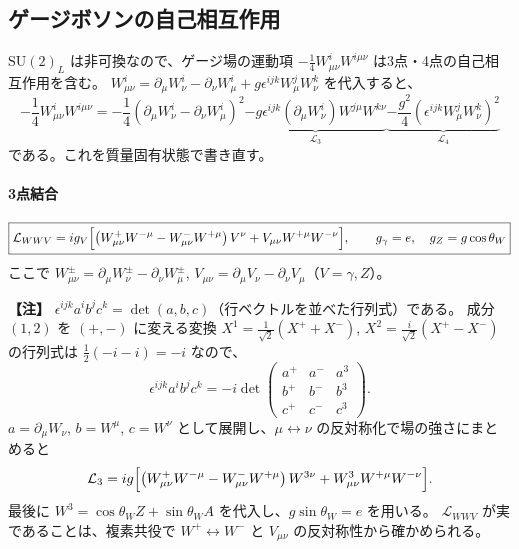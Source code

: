 \documentclass[uplatex,dvipdfmx,a4paper,11pt,openany]{jsbook}
\newenvironment{note}{\vspace{1ex}\par\footnotesize\noindent\textbf{【注】}}{\par\vspace{1ex}}
\numberwithin{equation}{chapter}
\theoremstyle{definition}
\theoremstyle{plain}
\theoremstyle{remark}
\newcommand{\Lag}{\mathcal{L}}
\newcommand{\SU}{\mathrm{SU}}
\begin{document}
\subsection{ゲージボソンの自己相互作用}
$\SU(2)_L$ は非可換なので、ゲージ場の運動項 $-\frac14W^i_{\mu\nu}W^{i\mu\nu}$ は3点・4点の自己相互作用を含む。
$W^i_{\mu\nu}=\partial_\mu W^i_\nu-\partial_\nu W^i_\mu+g\epsilon^{ijk}W^j_\mu W^k_\nu$ を代入すると、
\begin{equation}
-\frac14W^i_{\mu\nu}W^{i\mu\nu}
=-\frac14\left(\partial_\mu W^i_\nu-\partial_\nu W^i_\mu\right)^2
\underbrace{-g\epsilon^{ijk}(\partial_\mu W^i_\nu)W^{j\mu}W^{k\nu}}_{\Lag_3}
\underbrace{-\frac{g^2}{4}\left(\epsilon^{ijk}W^j_\mu W^k_\nu\right)^2}_{\Lag_4}
\end{equation}
である。これを質量固有状態で書き直す。
\paragraph{3点結合}
\begin{equation}
\boxed{
\Lag_{WWV}=ig_V\Bigl[\left(W^+_{\mu\nu}W^{-\mu}-W^-_{\mu\nu}W^{+\mu}\right)V^\nu+V_{\mu\nu}W^{+\mu}W^{-\nu}\Bigr],
\qquad g_\gamma=e,\quad g_Z=g\cos\theta_W
}
\label{eq:WWV}
\end{equation}
ここで $W^\pm_{\mu\nu}=\partial_\mu W^\pm_\nu-\partial_\nu W^\pm_\mu$, $V_{\mu\nu}=\partial_\mu V_\nu-\partial_\nu V_\mu$（$V=\gamma,Z$）。
\begin{note}
$\epsilon^{ijk}a^ib^jc^k=\det(a,b,c)$（行ベクトルを並べた行列式）である。
成分 $(1,2)$ を $(+,-)$ に変える変換 $X^1=\frac{1}{\sqrt2}(X^++X^-)$, $X^2=\frac{i}{\sqrt2}(X^+-X^-)$ の行列式は $\frac12(-i-i)=-i$ なので、
\[
\epsilon^{ijk}a^ib^jc^k=-i\det\begin{pmatrix}a^+&a^-&a^3\\ b^+&b^-&b^3\\ c^+&c^-&c^3\end{pmatrix}.
\]
$a=\partial_\mu W_\nu$, $b=W^\mu$, $c=W^\nu$ として展開し、$\mu\leftrightarrow\nu$ の反対称化で場の強さにまとめると
\[
\Lag_3=ig\Bigl[\left(W^+_{\mu\nu}W^{-\mu}-W^-_{\mu\nu}W^{+\mu}\right)W^{3\nu}+W^3_{\mu\nu}W^{+\mu}W^{-\nu}\Bigr].
\]
最後に $W^3=\cos\theta_WZ+\sin\theta_WA$ を代入し、$g\sin\theta_W=e$ を用いる。
$\Lag_{WWV}$ が実であることは、複素共役で $W^+\leftrightarrow W^-$ と $V_{\mu\nu}$ の反対称性から確かめられる。
\end{note}
\end{document}
